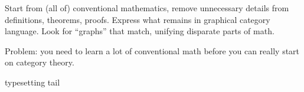 \documentclass[11pt,openany]{book}
\def \texFolder {../../tex/}
\begin{document}
Start from (all of) conventional mathematics,
remove unnecessary details from definitions, theorems, proofs.
Express what remains in graphical category language.
Look for ``graphs'' that match, unifying disparate parts of math.

Problem: you need to learn a lot of conventional math before
you can really start on category theory.

\backmatter
\pagestyle{back}
\glsaddallunused
\setcounter{currentlevel}{\value{baseSectionLevel}}
{typesetting}
\setcounter{currentlevel}{\value{baseSectionLevel}}
{tail}
\end{document}
